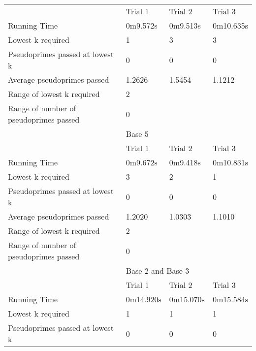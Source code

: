 \documentclass{article}
\begin{document}
\begin{appendices}
\begin{longtable}{llll}
\midrule
                                       & Trial 1   & Trial 2   & Trial 3        \\
Running Time                           & 0m9.572s  & 0m9.513s  & 0m10.635s      \\
Lowest k required                      & 1         & 3         & 3              \\
Pseudoprimes passed at lowest k        & 0         & 0         & 0              \\
Average pseudoprimes passed            & 1.2626    & 1.5454    & 1.1212         \\
\cmidrule(lr){2-2}\cmidrule(lr){3-3}\cmidrule(lr){4-4}
Range of lowest k required             & \multicolumn{3}{l}{2}                  \\
Range of number of pseudoprimes passed & \multicolumn{3}{l}{0}                  \\
\midrule
                                       & \multicolumn{3}{l}{Base 5}             \\
\midrule
                                       & Trial 1   & Trial 2   & Trial 3        \\
Running Time                           & 0m9.672s  & 0m9.418s  & 0m10.831s      \\
Lowest k required                      & 3         & 2         & 1              \\
Pseudoprimes passed at lowest k        & 0         & 0         & 0              \\
Average pseudoprimes passed            & 1.2020    & 1.0303    & 1.1010         \\
\cmidrule(lr){2-2}\cmidrule(lr){3-3}\cmidrule(lr){4-4}
Range of lowest k required             & \multicolumn{3}{l}{2}                  \\
Range of number of pseudoprimes passed & \multicolumn{3}{l}{0}                  \\
\midrule
                                       & \multicolumn{3}{l}{Base 2 and Base 3}  \\
\midrule
                                       & Trial 1   & Trial 2   & Trial 3        \\
Running Time                           & 0m14.920s & 0m15.070s & 0m15.584s      \\
Lowest k required                      & 1         & 1         & 1              \\
Pseudoprimes passed at lowest k        & 0         & 0         & 0              \\

\end{longtable}
\end{appendices}
\end{document}
